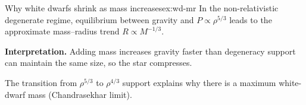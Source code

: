 \begin{example}{Why white dwarfs shrink as mass increases}{ex:wd-mr}
In the non-relativistic degenerate regime, equilibrium between gravity and
$P\propto\rho^{5/3}$ leads to the approximate mass--radius trend
$R\propto M^{-1/3}$.

\smallskip\textbf{Interpretation.}
Adding mass increases gravity faster than degeneracy support can maintain the same size, so the star compresses.
\end{example}

\begin{extra}
The transition from $\rho^{5/3}$ to $\rho^{4/3}$ support explains why there is a maximum white-dwarf mass (Chandrasekhar limit).
\end{extra}
